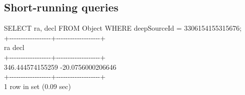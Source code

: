 \documentclass[DM,toc]{lsstdoc}
\begin{document}
\subsection{Short-running queries}\label{short-running-queries}

SELECT ra, decl FROM Object WHERE deepSourceId = 3306154155315676;\\
+-\/-\/-\/-\/-\/-\/-\/-\/-\/-\/-\/-\/-\/-\/-\/-\/-\/-+-\/-\/-\/-\/-\/-\/-\/-\/-\/-\/-\/-\/-\/-\/-\/-\/-\/-\/-+\\
\textbar{} ra \textbar{} decl \textbar{}\\
+-\/-\/-\/-\/-\/-\/-\/-\/-\/-\/-\/-\/-\/-\/-\/-\/-\/-+-\/-\/-\/-\/-\/-\/-\/-\/-\/-\/-\/-\/-\/-\/-\/-\/-\/-\/-+\\
\textbar{} 346.444574155259 \textbar{} -20.0756000206646 \textbar{}\\
+-\/-\/-\/-\/-\/-\/-\/-\/-\/-\/-\/-\/-\/-\/-\/-\/-\/-+-\/-\/-\/-\/-\/-\/-\/-\/-\/-\/-\/-\/-\/-\/-\/-\/-\/-\/-+\\
1 row in set (0.09 sec)

~
\end{document}
